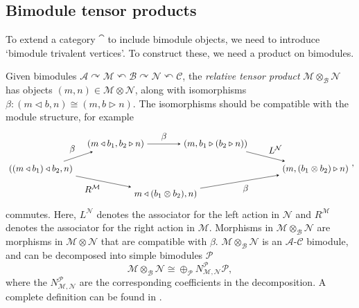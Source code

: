 
\subsection{Bimodule tensor products}\label{sec:bimodtensor}

To extend a category $\cat$ to include bimodule objects, we need to introduce `bimodule trivalent vertices'. To construct these, we need a product on bimodules. 

\begin{definition}
	Given bimodules $\mathcal{A}\curvearrowright\mathcal{M}\curvearrowleft\mathcal{B}\curvearrowright{\mathcal{N}}\curvearrowleft\mathcal{C}$, the \emph{relative tensor product} $\mathcal{M}\otimes_\mathcal{B}\mathcal{N}$ has objects $(m,n)\in \mathcal{M}\otimes\mathcal{N}$, along with isomorphisms $\beta:(m\triangleleft b,n)\cong(m,b\triangleright n)$. The isomorphisms should be compatible with the module structure, for example
	\begin{align}
	\begin{tikzpicture}[scale=.98,baseline=(current bounding box.center)]
	\node (A) at (-1,0) {$((m\triangleleft b_1)\triangleleft b_2,n)$};
	\node (B) at (2,1) {$(m\triangleleft b_1,b_2\triangleright n)$};
	\node (C) at (6,1) {$(m,b_1\triangleright(b_2\triangleright n))$};
	\node (D) at (10,0) {$(m,(b_1\otimes b_2)\triangleright n)$};
	\node (E) at (4,-1) {$m\triangleleft (b_1\otimes b_2), n)$};
	\draw [-stealth,above left] (A)--(B) node [pos=.5] {$\beta$};
	\draw [-stealth,above] (B)--(C) node [pos=.5] {$\beta$};
	\draw [-stealth,above right] (C)--(D) node [pos=.5] {$L^\mathcal{N}$};
	\draw [-stealth,below left] (A)--(E) node [pos=.5] {$R^{\mathcal{M}}$};
	\draw [-stealth,below right] (E)--(D) node [pos=.5] {$\beta$};
	\end{tikzpicture},
	\end{align}
	commutes. Here, $L^\mathcal{N}$ denotes the associator for the left action in $\mathcal{N}$ and $R^\mathcal{M}$ denotes the associator for the right action in $\mathcal{M}$. Morphisms in $\mathcal{M}\otimes_\mathcal{B}\mathcal{N}$ are morphisms in $\mathcal{M}\otimes\mathcal{N}$ that are compatible with $\beta$. $\mathcal{M}\otimes_\mathcal{B}\mathcal{N}$ is an $\mathcal{A}$-$\mathcal{C}$ bimodule, and can be decomposed into simple bimodules $\mathcal{P}$  $$\mathcal{M}\otimes_\mathcal{B}\mathcal{N}\cong\oplus_\mathcal{P}N_{\mathcal{M},\mathcal{N}}^\mathcal{P}\mathcal{P},$$
	where the $N_{\mathcal{M,N}}^\mathcal{P}$ are the corresponding coefficients in the decomposition. A complete definition can be found in \cite{DSPS14}.
\end{definition}

